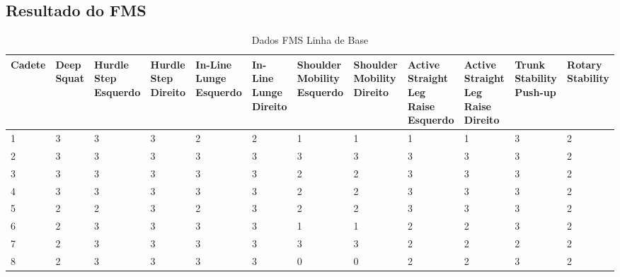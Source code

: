 \begin{landscape}
    \chapter{Resultado do \acrshort{FMS}}
    
    \begin{table}[h]
        \centering
        \caption{Dados FMS Linha de Base}
        \label{tab:fmsBase}
        \renewcommand{\arraystretch}{1.3}  %
        \begin{adjustbox}{scale=0.9}
        \begin{tabular}{|p{1.8cm}|p{1.6cm}|p{1.6cm}|p{1.6cm}|p{1.6cm}|p{1.6cm}|p{1.6cm}|p{1.6cm}|p{1.6cm}|p{1.6cm}|p{1.6cm}|p{1.6cm}|}
            \hline
            \textbf{Cadete} & \textbf{Deep Squat} & \textbf{Hurdle Step Esquerdo} & \textbf{Hurdle Step Direito} & \textbf{In-Line Lunge Esquerdo} & \textbf{In-Line Lunge Direito} & \textbf{Shoulder Mobility Esquerdo} & \textbf{Shoulder Mobility Direito} & \textbf{Active Straight Leg Raise Esquerdo} & \textbf{Active Straight Leg Raise Direito} & \textbf{Trunk Stability Push-up} & \textbf{Rotary Stability} \\
            \hline
            1 & 3 & 3 & 3 & 2 & 2 & 1 & 1 & 1 & 1 & 3 & 2 \\
            2 & 3 & 3 & 3 & 3 & 3 & 3 & 3 & 3 & 3 & 3 & 2 \\
            3 & 3 & 3 & 3 & 3 & 3 & 2 & 2 & 3 & 3 & 3 & 2 \\
            4 & 3 & 3 & 3 & 3 & 3 & 2 & 2 & 3 & 3 & 3 & 2 \\
            5 & 2 & 2 & 3 & 2 & 3 & 2 & 2 & 3 & 3 & 3 & 2 \\
            6 & 2 & 3 & 3 & 3 & 3 & 1 & 1 & 2 & 2 & 3 & 2 \\
            7 & 2 & 3 & 3 & 3 & 3 & 3 & 3 & 2 & 2 & 2 & 2 \\
            8 & 2 & 3 & 3 & 3 & 3 & 0 & 0 & 2 & 2 & 3 & 2 \\
            \hline
        \end{tabular}
        \end{adjustbox}
    \end{table}
    

\end{landscape}
